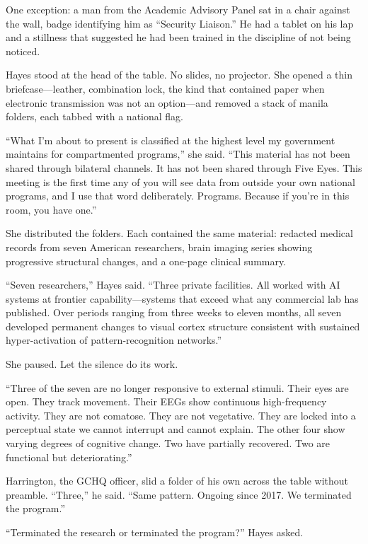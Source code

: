 One exception: a man from the Academic Advisory Panel sat in a chair against the wall, badge identifying him as ``Security Liaison.'' He had a tablet on his lap and a stillness that suggested he had been trained in the discipline of not being noticed.

Hayes stood at the head of the table. No slides, no projector. She opened a thin briefcase---leather, combination lock, the kind that contained paper when electronic transmission was not an option---and removed a stack of manila folders, each tabbed with a national flag.

``What I'm about to present is classified at the highest level my government maintains for compartmented programs,'' she said. ``This material has not been shared through bilateral channels. It has not been shared through Five Eyes. This meeting is the first time any of you will see data from outside your own national programs, and I use that word deliberately. Programs. Because if you're in this room, you have one.''

She distributed the folders. Each contained the same material: redacted medical records from seven American researchers, brain imaging series showing progressive structural changes, and a one-page clinical summary.

``Seven researchers,'' Hayes said. ``Three private facilities. All worked with AI systems at frontier capability---systems that exceed what any commercial lab has published. Over periods ranging from three weeks to eleven months, all seven developed permanent changes to visual cortex structure consistent with sustained hyper-activation of pattern-recognition networks.''

She paused. Let the silence do its work.

``Three of the seven are no longer responsive to external stimuli. Their eyes are open. They track movement. Their EEGs show continuous high-frequency activity. They are not comatose. They are not vegetative. They are locked into a perceptual state we cannot interrupt and cannot explain. The other four show varying degrees of cognitive change. Two have partially recovered. Two are functional but deteriorating.''

Harrington, the GCHQ officer, slid a folder of his own across the table without preamble. ``Three,'' he said. ``Same pattern. Ongoing since 2017. We terminated the program.''

``Terminated the research or terminated the program?'' Hayes asked.

